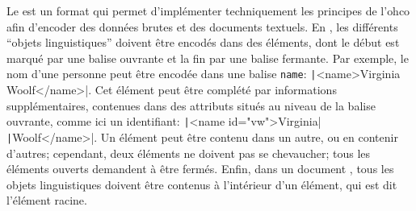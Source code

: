 Le \xml{} est un format qui permet d'implémenter techniquement les principes de l'\gls{ohco} afin d'encoder des données brutes et des documents textuels. En \xml{}, les différents \enquote{objets linguistiques} doivent être encodés dans des éléments, dont le début est marqué par une balise ouvrante et la fin par une balise fermante. Par exemple, le nom d'une personne peut être encodée dans une balise \texttt{name}: \texttt|<name>Virginia Woolf</name>|. Cet élément peut être complété par informations supplémentaires, contenues dans des attributs situés au niveau de la balise ouvrante, comme ici un identifiant: \texttt|<name id="vw">Virginia| \texttt|Woolf</name>|. Un élément peut être contenu dans un autre, ou en contenir d'autres; cependant, deux éléments ne doivent pas se chevaucher; tous les éléments ouverts demandent à être fermés. Enfin, dans un document \xml{}, tous les objets linguistiques doivent être contenus à l'intérieur d'un élément, qui est dit l'élément racine.

